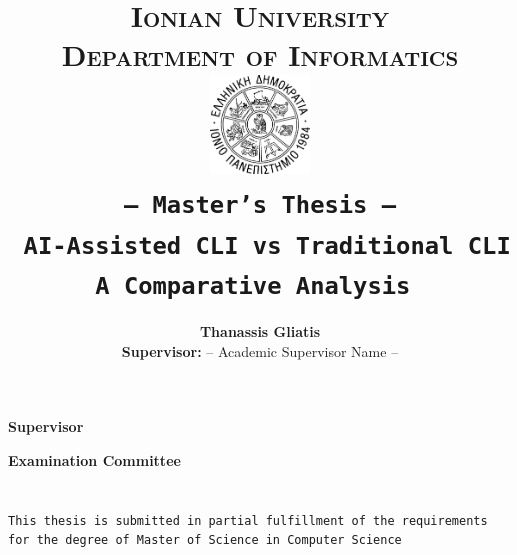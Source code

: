 \documentclass[a4paper,11pt,oneside,openany]{styles/ioniothesis}
\begin{document}
\author{\textbf{Thanassis Gliatis} \\ \textbf{Supervisor:}  -- Academic Supervisor Name --}
\title{
	\textbf{\LARGE{\textsc{Ionian University}}
		\bigskip \\
		\large{\textsc{Department of Informatics}}
		\bigskip \\ \bigskip \bigskip \bigskip
		\bigskip \bigskip
		\includegraphics[width=0.2\textwidth]{./assets/figures/ionio_logo.pdf}
		\bigskip \\ \bigskip
		\texttt{\large{-- Master's Thesis --}}
		\bigskip \\ \bigskip
		\textbf{\Large{\texttt{
			AI-Assisted CLI vs Traditional CLI \\
			A Comparative Analysis
		}}}
		\bigskip \\ \bigskip}
}
\maketitle


\pagestyle{empty}
\cleardoublepage


\chapter*{}
\thispagestyle{empty}

\begin{center}
	\Large{\textbf{Supervisor}}
\end{center}

\begin{center}
	\Large{\textbf{Examination Committee}}
\end{center}


\pagestyle{empty}
\cleardoublepage


\chapter*{}
\thispagestyle{empty}
\begin{center}
	\texttt{This thesis is submitted in partial fulfillment of the requirements for the degree of Master of Science in Computer Science}
\end{center}
\end{document}
